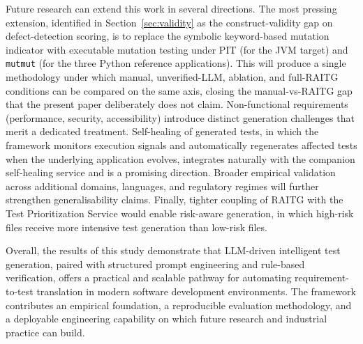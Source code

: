 \documentclass[conference]{IEEEtran}
\begin{document}
Future research can extend this work in several directions. The most pressing extension, identified in Section~\ref{sec:validity} as the construct-validity gap on defect-detection scoring, is to replace the symbolic keyword-based mutation indicator with executable mutation testing under PIT (for the JVM target) and \texttt{mutmut} (for the three Python reference applications). This will produce a single methodology under which manual, unverified-LLM, ablation, and full-RAITG conditions can be compared on the same axis, closing the manual-vs-RAITG gap that the present paper deliberately does not claim. Non-functional requirements (performance, security, accessibility) introduce distinct generation challenges that merit a dedicated treatment. Self-healing of generated tests, in which the framework monitors execution signals and automatically regenerates affected tests when the underlying application evolves, integrates naturally with the companion self-healing service and is a promising direction. Broader empirical validation across additional domains, languages, and regulatory regimes will further strengthen generalisability claims. Finally, tighter coupling of RAITG with the Test Prioritization Service would enable risk-aware generation, in which high-risk files receive more intensive test generation than low-risk files.

Overall, the results of this study demonstrate that LLM-driven intelligent test generation, paired with structured prompt engineering and rule-based verification, offers a practical and scalable pathway for automating requirement-to-test translation in modern software development environments. The framework contributes an empirical foundation, a reproducible evaluation methodology, and a deployable engineering capability on which future research and industrial practice can build.
\end{document}
